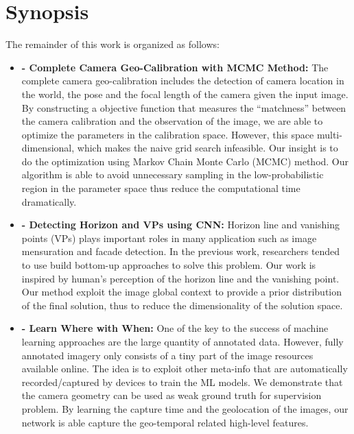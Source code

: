 \section{Synopsis}

The remainder of this work is organized as follows:
  
\begin{itemize}[noitemsep]

  \item \textbf{ - 
  Complete Camera Geo-Calibration with MCMC Method:} \newline \newline
  The complete camera geo-calibration includes the detection of camera
  location in the world, the pose and the focal length of the camera
  given the input image. By constructing a objective function that
  measures the ``matchness'' between the camera calibration and the
  observation of the image, we are able to optimize the parameters in
  the calibration space. However, this space multi-dimensional, which
  makes the naive grid search infeasible. Our insight is to do the
  optimization using Markov Chain Monte Carlo (MCMC) method. Our
  algorithm is able to avoid unnecessary sampling in the
  low-probabilistic region in the parameter space thus reduce the
  computational time dramatically. \newline

  \item \textbf{ -
  Detecting Horizon and VPs using CNN:} \newline \newline
  Horizon line and vanishing points (VPs) plays important roles in many
  application such as image mensuration and facade detection. In the
  previous work, researchers tended to use build bottom-up approaches to
  solve this problem. Our work is inspired by human's perception of the
  horizon line and the vanishing point. Our method exploit the image
  global context to provide a prior distribution of the final solution,
  thus to reduce the dimensionality of the solution space. \newline

  \item \textbf{ -
  Learn Where with When:} \newline \newline
  One of the key to the success of machine learning approaches are the
  large quantity of annotated data. However, fully annotated imagery
  only consists of a tiny part of the image resources available online.
  The idea is to exploit other meta-info that are automatically
  recorded/captured by devices to train the ML models.  We demonstrate
  that the camera geometry can be used as weak ground truth for
  supervision problem. By learning the capture time and the geolocation
  of the images, our network is able capture the geo-temporal related
  high-level features. \newline


\end{itemize}

